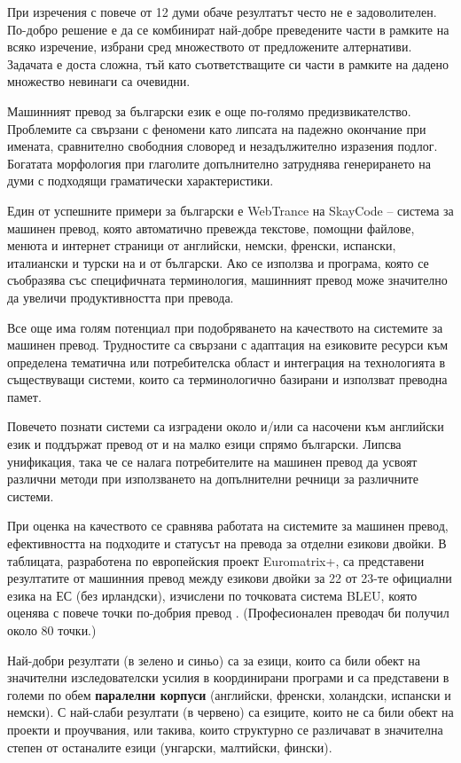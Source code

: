 \documentclass[]{../../metanetpaper}
\begin{document}
\begin{multicols}{2}
При изречения с повече от 12 думи обаче резултатът често не е задоволителен. По-добро решение е да се комбинират най-добре преведените части в рамките на всяко изречение, избрани сред множеството от предложените алтернативи. 
Задачата е доста сложна, тъй като съответстващите си части в рамките на дадено множество невинаги са очевидни.

Машинният превод за български език е още по-голямо предизвикателство. Проблемите са свързани с феномени като липсата на падежно окончание при имената, сравнително свободния словоред и незадължително изразения подлог. Богатата морфология при глаголите допълнително затруднява генерирането на думи с подходящи граматически характеристики.

Един от успешните примери за български е WebTrance на SkayCode – система за машинен превод, която автоматично превежда текстове, помощни файлове, менюта и интернет страници от английски, немски, френски, испански, италиански и турски на и от български. Ако се използва и програма, която се съобразява със специфичната терминология, машинният превод може значително да увеличи продуктивността при превода.

Все  още има голям потенциал при подобряването на качеството на системите за машинен превод. Трудностите са свързани с адаптация на езиковите ресурси към определена тематична или потребителска област и интеграция на технологията в
 съществуващи системи, които са терминологично базирани и използват преводна памет. 

Повечето познати системи са изградени около и/или са насочени към английски език и поддържат превод от и на малко езици спрямо български. Липсва унификация, така че се налага потребителите на машинен превод да усвоят
 различни методи при използването на допълнителни речници за различните системи.

При оценка на качеството се сравнява работата на системите за
 машинен превод, ефективността на подходите и статусът на превода за отделни
 езикови двойки. В таблицата, разработена по европейския проект
 Euromatrix+, са представени резултатите от машинния
 превод между езикови двойки за 22 от 23-те официални езика на ЕС
 (без ирландски), изчислени по точковата система BLEU, която оценява с повече точки по-добрия превод \cite{bleu1}. (Професионален преводач би получил около 80 точки.)

Най-добри резултати (в зелено и синьо) са за езици, които са били обект на значителни изследователски усилия в координирани програми и са представени в големи по обем \textbf{паралелни корпуси} (английски, френски, холандски, испански и немски). С най-слаби резултати (в червено) са езиците, които не са били обект на проекти и проучвания, или такива, които структурно се различават в значителна степен от останалите езици (унгарски, малтийски, фински).


\end{multicols}
\end{document}
